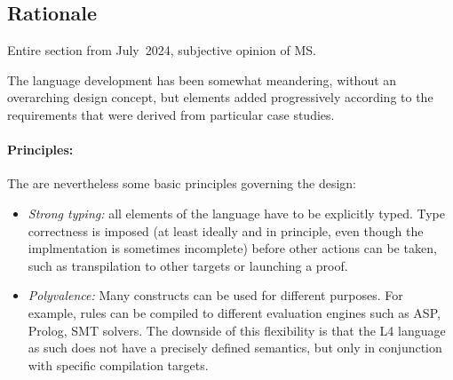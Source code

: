 
\subsection{Rationale}\label{sec:rationale}


\begin{tcolorbox}[breakable,colback=yellow!5,colframe=yellow!75!black,
  title=Personal Comments]

  Entire section from July~2024, subjective opinion of MS.
\end{tcolorbox}

The language development has been somewhat meandering, without an overarching
design concept, but elements added progressively according to the
requirements that were derived from particular case studies.

\paragraph{Principles:} The are nevertheless some basic principles governing
the design:
\begin{itemize}
\item \emph{Strong typing:} all elements of the language have to be explicitly
  typed. Type correctness is imposed (at least ideally and in principle, even
  though the implmentation is sometimes incomplete) before other actions can
  be taken, such as transpilation to other targets or launching a proof.
\item \emph{Polyvalence:} Many constructs can be used for different
  purposes. For example, rules can be compiled to different evaluation engines
  such as ASP, Prolog, SMT solvers. The downside of this flexibility is that
  the L4 language as such does not have a precisely defined semantics, but
  only in conjunction with specific compilation targets.
\end{itemize}


